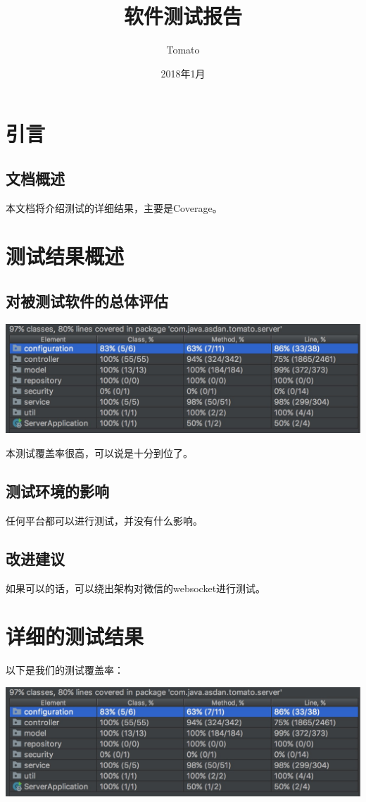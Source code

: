 \documentclass{article}
\title{软件测试报告}
\author{Tomato}
\date{2018年1月}
\begin{document}
	\maketitle
		\section{引言}
			\subsection{文档概述}
				本文档将介绍测试的详细结果，主要是Coverage。
		\section{测试结果概述}
			\subsection{对被测试软件的总体评估}
				\includegraphics[scale = .3]{fig/test_1.jpg}

				本测试覆盖率很高，可以说是十分到位了。
			\subsection{测试环境的影响}
				任何平台都可以进行测试，并没有什么影响。
			\subsection{改进建议}
				如果可以的话，可以绕出架构对微信的websocket进行测试。
		\section{详细的测试结果}
			以下是我们的测试覆盖率：

			\includegraphics[scale = .3]{fig/test_1.jpg}
		
\end{document}
